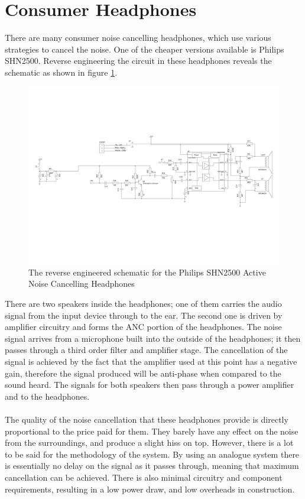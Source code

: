 \section{Consumer Headphones}
There are many consumer noise cancelling headphones, which use various strategies to cancel the noise.
One of the cheaper versions available is Philips SHN2500.
Reverse engineering the circuit in these headphones reveals the schematic as shown in figure \ref{fig:philipsphonessche}.
\\
\begin{figure}
	\centering
	\includegraphics[width=\textwidth]{./img/hp.pdf}
	\caption{The reverse engineered schematic for the Philips SHN2500 Active Noise Cancelling Headphones}
	\label{fig:philipsphonessche}
\end{figure}

\noindent
There are two speakers inside the headphones; one of them carries the audio signal from the input device through to the ear.
The second one is driven by amplifier circuitry and forms the ANC portion of the headphones.
The noise signal arrives from a microphone built into the outside of the headphones; it then passes through a third order filter and amplifier stage.
The cancellation of the signal is achieved by the fact that the amplifier used at this point has a negative gain, therefore the signal produced will be anti-phase when compared to the sound heard.
The signals for both speakers then pass through a power amplifier and to the headphones.
\\
\\
The quality of the noise cancellation that these headphones provide is directly proportional to the price paid for them. They barely have any effect on the noise from the surroundings, and produce a slight hiss on top.
However, there is a lot to be said for the methodology of the system. By using an analogue system there is essentially no delay on the signal as it passes through, meaning that maximum cancellation can be achieved.
There is also minimal circuitry and component requirements, resulting in a low power draw, and low overheads in construction.
